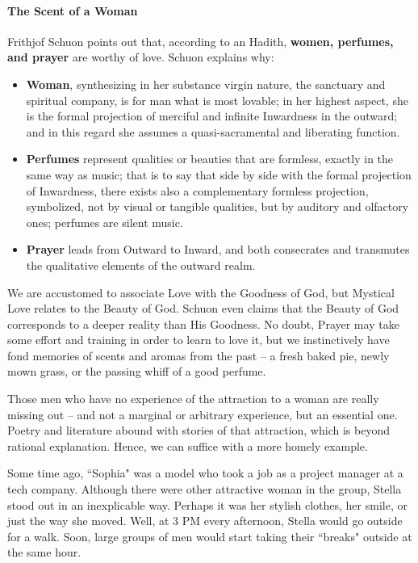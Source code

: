 \paragraph{The Scent of a Woman}
Frithjof Schuon points out that, according to an Hadith, \textbf{women, perfumes, and prayer} are worthy of love. Schuon explains why:

\begin{itemize}
\item \textbf{Woman}, synthesizing in her substance virgin nature, the sanctuary and spiritual company, is for man what is most lovable; in her highest aspect, she is the formal projection of merciful and infinite Inwardness in the outward; and in this regard she assumes a quasi-sacramental and liberating function. 
\item \textbf{Perfumes} represent qualities or beauties that are formless, exactly in the same way as music; that is to say that side by side with the formal projection of Inwardness, there exists also a complementary formless projection, symbolized, not by visual or tangible qualities, but by auditory and olfactory ones; perfumes are silent music. 
\item \textbf{Prayer} leads from Outward to Inward, and both consecrates and transmutes the qualitative elements of the outward realm. 
\end{itemize}
We are accustomed to associate Love with the Goodness of God, but Mystical Love relates to the Beauty of God. Schuon even claims that the Beauty of God corresponds to a deeper reality than His Goodness. No doubt, Prayer may take some effort and training in order to learn to love it, but we instinctively have fond memories of scents and aromas from the past – a fresh baked pie, newly mown grass, or the passing whiff of a good perfume.

Those men who have no experience of the attraction to a woman are really missing out – and not a marginal or arbitrary experience, but an essential one. Poetry and literature abound with stories of that attraction, which is beyond rational explanation. Hence, we can suffice with a more homely example.

Some time ago, ``Sophia" was a model who took a job as a project manager at a tech company. Although there were other attractive woman in the group, Stella stood out in an inexplicable way. Perhaps it was her stylish clothes, her smile, or just the way she moved. Well, at 3 PM every afternoon, Stella would go outside for a walk. Soon, large groups of men would start taking their ``breaks" outside at the same hour.

